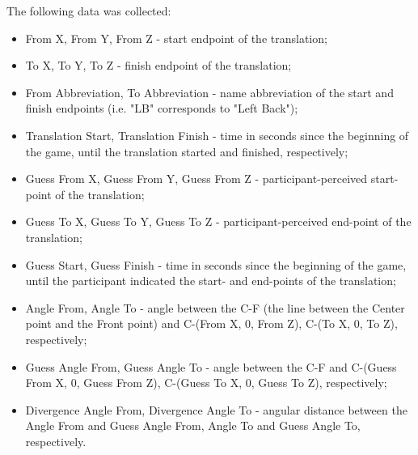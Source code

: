 The following data was collected:
\begin{itemize}
	\item From X, From Y, From Z - start endpoint of the translation;
	\item To X, To Y, To Z - finish endpoint of the translation;
	\item From Abbreviation, To Abbreviation - name abbreviation of the start and finish endpoints (i.e. "LB" corresponds to "Left Back");
	\item Translation Start, Translation Finish - time in seconds since the beginning of the game, until the translation started and finished, respectively;
	\item Guess From X, Guess From Y, Guess From Z - participant-perceived start-point of the translation;
	\item Guess To X, Guess To Y, Guess To Z - participant-perceived end-point of the translation;
	\item Guess Start, Guess Finish - time in seconds since the beginning of the game, until the participant indicated the start- and end-points of the translation;
	\item Angle From, Angle To - angle between the C-F (the line between the Center point and the Front point) and C-(From X, 0, From Z), C-(To X, 0, To Z), respectively;
	\item Guess Angle From, Guess Angle To - angle between the C-F and C-(Guess From X, 0, Guess From Z), C-(Guess To X, 0, Guess To Z), respectively;
	\item Divergence Angle From, Divergence Angle To - angular distance between the Angle From and Guess Angle From, Angle To and Guess Angle To, respectively.
\end{itemize}


